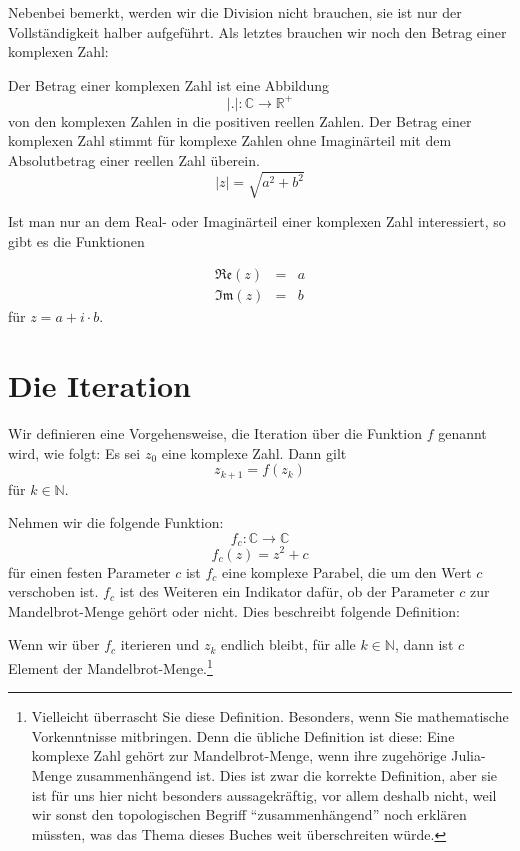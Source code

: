 \noindent Nebenbei bemerkt, werden wir die Division nicht brauchen, sie ist nur der Vollständigkeit halber aufgeführt. Als letztes brauchen wir noch den Betrag einer komplexen Zahl:
\begin{definition}
Der Betrag einer komplexen Zahl ist eine Abbildung 
\begin{equation}
\vert . \vert : \mathbb{C} \longrightarrow \mathbb{R}^+
\end{equation}
von den komplexen Zahlen in die positiven reellen Zahlen. Der Betrag einer komplexen Zahl stimmt für komplexe Zahlen ohne Imaginärteil mit dem Absolutbetrag einer reellen Zahl überein.
\begin{equation}
\vert z \vert = \sqrt{a^2+b^2}
\end{equation}
\end{definition}

Ist man nur an dem Real- oder Imaginärteil einer komplexen Zahl interessiert, so gibt es die Funktionen

\begin{eqnarray}
\mathfrak{Re}(z) &=& a \\
\mathfrak{Im}(z) &=& b
\end{eqnarray}
für $z=a+i\cdot b$.

\section{Die Iteration}
\begin{definition}
Wir definieren eine Vorgehensweise, die Iteration über die Funktion $f$ genannt wird, wie folgt: Es sei $z_0$ eine komplexe Zahl. Dann gilt
\begin{equation}
z_{k+1} = f(z_k)
\end{equation}
für $k\in \mathbb{N}$.
\end{definition}

Nehmen wir die folgende Funktion:
\begin{equation*}
f_c : \mathbb{C} \longrightarrow \mathbb{C}
\end{equation*}
\begin{equation}\label{eq:mand}
f_c(z) = z^2+c
\end{equation}
für einen festen Parameter $c$ ist $f_c$ eine komplexe Parabel, die um den Wert $c$ verschoben ist. $f_c$ ist des Weiteren ein Indikator dafür, ob der Parameter $c$ zur Mandelbrot-Menge gehört oder nicht. Dies beschreibt folgende Definition:

\begin{definition}
Wenn wir über $f_c$ iterieren und $z_k$ endlich bleibt, für alle $k\in \mathbb{N}$, dann ist $c$ Element der Mandelbrot-Menge.\footnote{Vielleicht überrascht Sie diese Definition. Besonders, wenn Sie mathematische Vorkenntnisse mitbringen. Denn die übliche Definition ist diese: Eine komplexe Zahl gehört zur Mandelbrot-Menge, wenn ihre zugehörige Julia-Menge zusammenhängend ist. Dies ist zwar die korrekte Definition, aber sie ist für uns hier nicht besonders aussagekräftig, vor allem deshalb nicht, weil wir sonst den topologischen Begriff "`zusammenhängend"' noch erklären müssten, was das Thema dieses Buches weit überschreiten würde.}
\end{definition}

